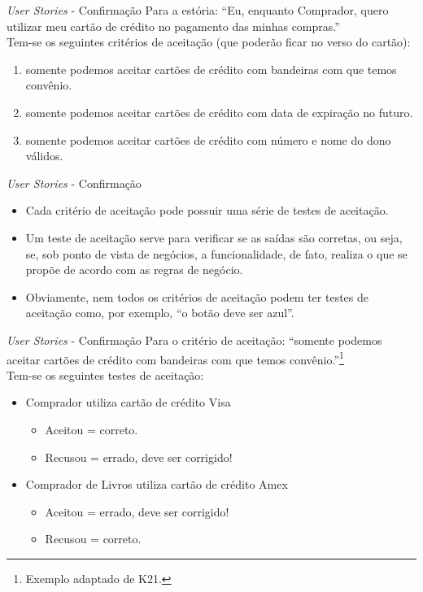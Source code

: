 \documentclass[11pt]{beamer}
\begin{document}
   \begin{frame}{\textit{User Stories} - Confirmação}
      Para a estória: ``Eu, enquanto Comprador, quero utilizar meu cartão de crédito no pagamento das minhas compras.''\\
      Tem-se os seguintes critérios de aceitação (que poderão ficar no verso do cartão):
      \begin{enumerate}
         \item somente podemos aceitar cartões de crédito com bandeiras com que temos convênio.
         \item somente podemos aceitar cartões de crédito com data de expiração no futuro.
         \item somente podemos aceitar cartões de crédito com número e nome do dono válidos.
      \end{enumerate}
   \end{frame}

   \begin{frame}{\textit{User Stories} - Confirmação}
      \begin{itemize}
         \item Cada critério de aceitação pode possuir uma série de testes de aceitação.
         \item Um teste de aceitação serve para verificar se as saídas são corretas, ou seja, se, sob ponto de vista de negócios, a funcionalidade, de fato, realiza o que se propõe de acordo com as regras de negócio.
         \item Obviamente, nem todos os critérios de aceitação podem ter testes de aceitação como, por exemplo, ``o botão deve ser azul''.
      \end{itemize}
   \end{frame}

   \begin{frame}{\textit{User Stories} - Confirmação}
      Para o critério de aceitação: ``somente podemos aceitar cartões de crédito com bandeiras com que temos convênio.''\footnote{Exemplo adaptado de K21.}\\
      Tem-se os seguintes testes de aceitação:
      \begin{itemize}
         \item Comprador utiliza cartão de crédito Visa
           \begin{itemize}
              \item Aceitou = correto.
              \item Recusou = errado, deve ser corrigido!
           \end{itemize}
         \item Comprador de Livros utiliza cartão de crédito Amex
           \begin{itemize}
              \item Aceitou = errado, deve ser corrigido!
              \item Recusou = correto.
           \end{itemize}
      \end{itemize}
   \end{frame}
\end{document}
